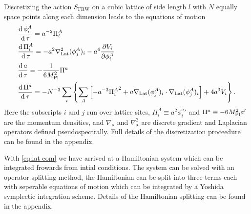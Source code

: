 Discretizing the action $S_{\mathrm{FRW}}$ on a cubic lattice of side length $l$ with $N$ equally space points along each dimension leads to the equations of motion
\begin{align} \label{eq:lat eom}
  & \frac{\mathrm{d}\,\phi^A_i}{\mathrm{d}\,\tau} = a^{-2}\Pi^A_i\\
  & \frac{\mathrm{d}\,\Pi^A_i}{\mathrm{d}\,\tau} = -a^2\nabla^2_{\mathrm{Lat}}(\phi^A_j)_i -a^4\frac{\partial V_i}{\partial \phi^A_i}\\
  & \frac{\mathrm{d}\, a}{\mathrm{d}\,\tau} = -\frac{1}{6M_{\mathrm{Pl}}^2}\Pi^a\\
  & \frac{\mathrm{d}\,\Pi^a}{\mathrm{d}\,\tau} = -N^{-3}\sum_i\left\{
  \sum_A\left[-a^{-3}{\Pi^A_i}^2 + a\nabla_{\mathrm{Lat}}(\phi^A_j)_i\cdot\nabla_{\mathrm{Lat}}(\phi^A_j)_i \right]
  + 4a^3V_i\right\}.
\end{align}
Here the subscripts $i$ and $j$ run over lattice sites, $\Pi^A_i \equiv a^2{\phi^a_i}'$ and $\Pi^a \equiv -6M_{\mathrm{Pl}}^2a'$ are the momentum densities, and $\nabla_\lat$ and $\nabla^2_\lat$ are discrete gradient and Laplacian operators defined pseudospectrally.
Full details of the discretization proceedure can be found in the appendix.


With \eqref{eq:lat eom} we have arrived at a Hamiltonian system which can be integrated frowards from intial conditions.
The system can be solved with an operator splitting method, the Hamiltonian can be split into three terms each with seperable equations of motion which can be integrated by a Yoshida symplectic integration scheme.
Details of the Hamiltonian splitting can be found in the appendix.

